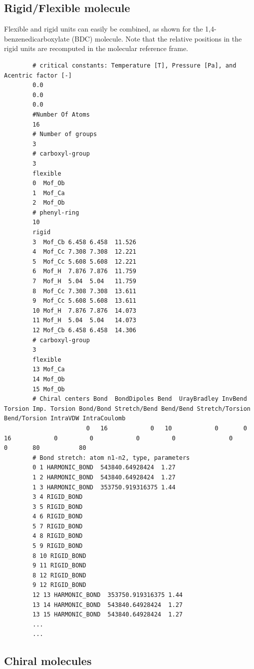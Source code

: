 \subsection{Rigid/Flexible molecule}
Flexible and rigid units can easily be combined, as shown for the 1,4-benzenedicarboxylate (BDC) molecule. Note that
the relative positions in the rigid units are recomputed in the molecular reference frame.
\begin{tiny}
\begin{verbatim}
        # critical constants: Temperature [T], Pressure [Pa], and Acentric factor [-]
        0.0
        0.0
        0.0
        #Number Of Atoms
        16
        # Number of groups
        3
        # carboxyl-group
        3
        flexible
        0  Mof_Ob
        1  Mof_Ca
        2  Mof_Ob
        # phenyl-ring
        10
        rigid
        3  Mof_Cb 6.458 6.458  11.526
        4  Mof_Cc 7.308 7.308  12.221
        5  Mof_Cc 5.608 5.608  12.221
        6  Mof_H  7.876 7.876  11.759
        7  Mof_H  5.04  5.04   11.759
        8  Mof_Cc 7.308 7.308  13.611
        9  Mof_Cc 5.608 5.608  13.611
        10 Mof_H  7.876 7.876  14.073
        11 Mof_H  5.04  5.04   14.073
        12 Mof_Cb 6.458 6.458  14.306
        # carboxyl-group
        3
        flexible
        13 Mof_Ca
        14 Mof_Ob
        15 Mof_Ob
        # Chiral centers Bond  BondDipoles Bend  UrayBradley InvBend  Torsion Imp. Torsion Bond/Bond Stretch/Bend Bend/Bend Stretch/Torsion Bend/Torsion IntraVDW IntraCoulomb
                       0   16            0   10            0       0       16            0         0            0         0               0            0       80           80
        # Bond stretch: atom n1-n2, type, parameters
        0 1 HARMONIC_BOND  543840.64928424  1.27
        1 2 HARMONIC_BOND  543840.64928424  1.27
        1 3 HARMONIC_BOND  353750.919316375 1.44
        3 4 RIGID_BOND
        3 5 RIGID_BOND
        4 6 RIGID_BOND
        5 7 RIGID_BOND
        4 8 RIGID_BOND
        5 9 RIGID_BOND
        8 10 RIGID_BOND
        9 11 RIGID_BOND
        8 12 RIGID_BOND
        9 12 RIGID_BOND
        12 13 HARMONIC_BOND  353750.919316375 1.44
        13 14 HARMONIC_BOND  543840.64928424  1.27
        13 15 HARMONIC_BOND  543840.64928424  1.27
        ...
        ...
\end{verbatim}
\end{tiny}

\subsection{Chiral molecules}

